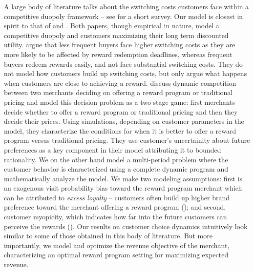 A large body of literature talks about the switching costs customers face within a competitive duopoly framework -- see \cite{villas2015short} for a short survey.
Our model is closest in spirit to that of \cite{hartmann2008frequency} and \cite{kopalle2001economic}.
Both papers, though empirical in nature, model a competitive duopoly and customers maximizing their long term discounted utility.
\cite{hartmann2008frequency} argue that less frequent buyers face higher switching costs as they are more likely to be affected by reward redemption deadlines, whereas frequent buyers redeem rewards easily, and not face substantial switching costs. 
They do not model how customers build up switching costs, but only argue what happens when customers are close to achieving a reward.
\cite{kopalle2001economic} discuss dynamic competition between two merchants deciding on offering a reward program or traditional pricing and model this decision problem as a two stage game: first merchants decide whether to offer a reward program or traditional pricing and then they decide their prices. 
Using simulations, depending on customer parameters in the model, they characterize the conditions for when it is better to offer a reward program versus traditional pricing.
They use customer's uncertainity about future preferences as a key component in their model attributing it to bounded rationality.
We on the other hand model a multi-period problem where the customer behavior is characterized using a complete dynamic program and mathematically analyze the model.
We make two modeling assumptions: first is an exogenous visit probability bias toward the reward program merchant which can be attributed to \emph{excess loyalty} -- customers often build up higher brand preference toward the merchant offering a reward program (\cite{fader1993excess, sharp1997loyalty}); 
and second, customer myopicity, which indicates how far into the future customers can perceive the rewards (\cite{liu2007long,lewis2004influence}).
Our results on customer choice dynamics intuitively look similar to some of those obtained in this body of literature.
But more importantly, we model and optimize the revenue objective of the merchant, characterizing an optimal reward program setting for maximizing expected revenue.
